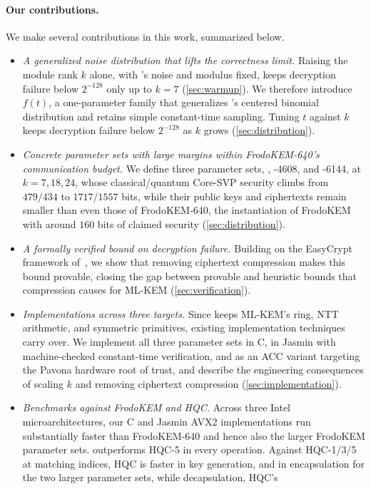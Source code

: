 \paragraph{Our contributions.}
We make several contributions in this work, summarized below.
\begin{itemize}
  \item \emph{A generalized noise distribution that lifts the correctness limit.} Raising the module rank $k$ alone, with \kyber's noise and
    modulus fixed, keeps decryption failure below $2^{-128}$ only up to $k=7$ (\cref{sec:warmup}). We therefore introduce
    $f(t)$, a one-parameter family that generalizes \kyber's centered binomial distribution and 
    retains simple constant-time sampling. Tuning $t$ against
    $k$ keeps decryption failure below $2^{-128}$ as $k$ grows (\cref{sec:distribution}).
  \item \emph{Concrete parameter sets with large margins within FrodoKEM-640's communication budget.} We define three parameter sets,
    , -4608, and -6144, at $k=7,18,24$, whose classical/quantum Core-SVP security climbs from $479/434$ to $1717/1557$
    bits, while their public keys and ciphertexts remain smaller than even those of FrodoKEM-640, the instantiation of FrodoKEM with around $160$ bits of claimed security (\cref{sec:distribution}).
  \item \emph{A formally verified bound on decryption failure.} Building on the EasyCrypt framework of~\cite{CCS:BKLSS25}, we show
    that removing ciphertext compression makes this bound provable, closing the gap between provable and heuristic bounds that
    compression causes for ML-KEM (\cref{sec:verification}).
  \item \emph{Implementations across three targets.} Since \kaiburr keeps ML-KEM's ring, NTT arithmetic, and symmetric
    primitives, existing implementation techniques carry over. We implement all three parameter sets in C, in Jasmin with
    machine-checked constant-time verification, and as an ACC variant targeting the Pavona hardware root of trust, and describe the
    engineering consequences of scaling $k$ and removing ciphertext compression (\cref{sec:implementation}).
  \item \emph{Benchmarks against FrodoKEM and HQC.} Across three Intel microarchitectures, our C and Jasmin AVX2 implementations run
    substantially faster than FrodoKEM-640 and hence also the larger FrodoKEM parameter sets.  outperforms HQC-5 in every operation. Against HQC-1/3/5 at matching
    indices, HQC is faster in key generation, and in encapsulation for the two larger parameter sets, while decapsulation, HQC's

\end{itemize}
